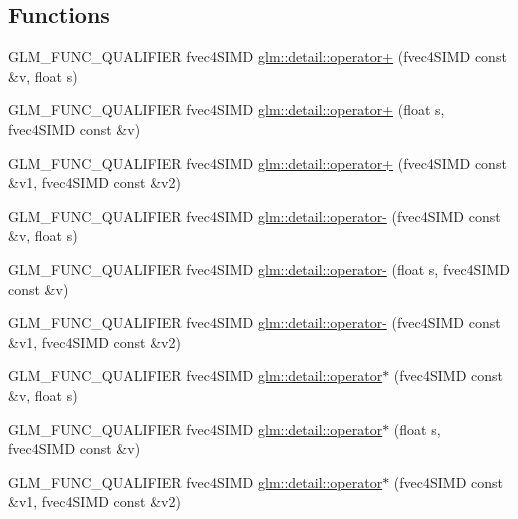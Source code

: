 \subsection*{Functions}
\begin{DoxyCompactItemize}
\item 
G\+L\+M\+\_\+\+F\+U\+N\+C\+\_\+\+Q\+U\+A\+L\+I\+F\+I\+E\+R fvec4\+S\+I\+M\+D \hyperlink{namespaceglm_1_1detail_a45efa4aad92d96409a70747c0dc60002}{glm\+::detail\+::operator+} (fvec4\+S\+I\+M\+D const \&v, float s)
\item 
G\+L\+M\+\_\+\+F\+U\+N\+C\+\_\+\+Q\+U\+A\+L\+I\+F\+I\+E\+R fvec4\+S\+I\+M\+D \hyperlink{namespaceglm_1_1detail_adf78a90e11a6b2bdf419cc04fae5407c}{glm\+::detail\+::operator+} (float s, fvec4\+S\+I\+M\+D const \&v)
\item 
G\+L\+M\+\_\+\+F\+U\+N\+C\+\_\+\+Q\+U\+A\+L\+I\+F\+I\+E\+R fvec4\+S\+I\+M\+D \hyperlink{namespaceglm_1_1detail_a015946565bf753ced27292739ae9212d}{glm\+::detail\+::operator+} (fvec4\+S\+I\+M\+D const \&v1, fvec4\+S\+I\+M\+D const \&v2)
\item 
G\+L\+M\+\_\+\+F\+U\+N\+C\+\_\+\+Q\+U\+A\+L\+I\+F\+I\+E\+R fvec4\+S\+I\+M\+D \hyperlink{namespaceglm_1_1detail_a2ccde71dbbac0adcfa13ee322d5313eb}{glm\+::detail\+::operator-\/} (fvec4\+S\+I\+M\+D const \&v, float s)
\item 
G\+L\+M\+\_\+\+F\+U\+N\+C\+\_\+\+Q\+U\+A\+L\+I\+F\+I\+E\+R fvec4\+S\+I\+M\+D \hyperlink{namespaceglm_1_1detail_aeb2f0978202f5110b6303a3151797240}{glm\+::detail\+::operator-\/} (float s, fvec4\+S\+I\+M\+D const \&v)
\item 
G\+L\+M\+\_\+\+F\+U\+N\+C\+\_\+\+Q\+U\+A\+L\+I\+F\+I\+E\+R fvec4\+S\+I\+M\+D \hyperlink{namespaceglm_1_1detail_a2e5e6062fe6a3f295b0f17a9bf4463e0}{glm\+::detail\+::operator-\/} (fvec4\+S\+I\+M\+D const \&v1, fvec4\+S\+I\+M\+D const \&v2)
\item 
G\+L\+M\+\_\+\+F\+U\+N\+C\+\_\+\+Q\+U\+A\+L\+I\+F\+I\+E\+R fvec4\+S\+I\+M\+D \hyperlink{namespaceglm_1_1detail_a640fd1bfb152eec121c97429854496cf}{glm\+::detail\+::operator$\ast$} (fvec4\+S\+I\+M\+D const \&v, float s)
\item 
G\+L\+M\+\_\+\+F\+U\+N\+C\+\_\+\+Q\+U\+A\+L\+I\+F\+I\+E\+R fvec4\+S\+I\+M\+D \hyperlink{namespaceglm_1_1detail_a00cbd7d01eca0724ee68cdf04fa55d62}{glm\+::detail\+::operator$\ast$} (float s, fvec4\+S\+I\+M\+D const \&v)
\item 
G\+L\+M\+\_\+\+F\+U\+N\+C\+\_\+\+Q\+U\+A\+L\+I\+F\+I\+E\+R fvec4\+S\+I\+M\+D \hyperlink{namespaceglm_1_1detail_ae683c4041ea23fddf34c36b87cbbd319}{glm\+::detail\+::operator$\ast$} (fvec4\+S\+I\+M\+D const \&v1, fvec4\+S\+I\+M\+D const \&v2)

\end{DoxyCompactItemize}
